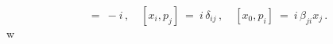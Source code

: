 \begin{equation}[ x_0 , p_0 ] \ = \ -i\, ,\quad [ x_i ,
p_j ] \ = \ i\,\delta_{i j}\, ,\quad [ x_0 , p_i ] \ = \
i\,\beta_{j i} x_j\, .\label{r324}\end{equation}w
